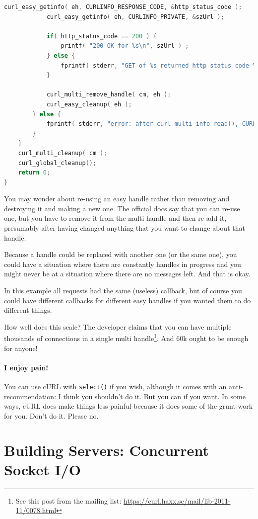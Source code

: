 \documentclass[a4paper]{report}
\begin{document}
\begin{lstlisting}[language=C]
            curl_easy_getinfo( eh, CURLINFO_RESPONSE_CODE, &http_status_code );
            curl_easy_getinfo( eh, CURLINFO_PRIVATE, &szUrl );

            if( http_status_code == 200 ) {
                printf( "200 OK for %s\n", szUrl ) ;
            } else {
                fprintf( stderr, "GET of %s returned http status code %d\n", szUrl, http_status_code );
            }

            curl_multi_remove_handle( cm, eh );
            curl_easy_cleanup( eh );
        } else {
            fprintf( stderr, "error: after curl_multi_info_read(), CURLMsg=%d\n", msg->msg );
        }
    }
    curl_multi_cleanup( cm );
    curl_global_cleanup();
    return 0;
}
\end{lstlisting}

You may wonder about re-using an easy handle rather than removing and destroying it and making a new one. The official docs say that you can re-use one, but you have to remove it from the multi handle and then re-add it, presumably after having changed anything that you want to change about that handle. 

Because a handle could be replaced with another one (or the same one), you could have a situation where there are constantly handles in progress and you might never be at a situation where there are no messages left. And that is okay.

In this example all requests had the same (useless) callback, but of course you could have different callbacks for different easy handles if you wanted them to do different things.

How well does this scale? The developer claims that you can have multiple thousands of connections in a single multi handle\footnote{See this post from the mailing list: \url{https://curl.haxx.se/mail/lib-2011-11/0078.html}}. And 60k ought to be enough for anyone!

\paragraph{I enjoy pain!} You can use cURL with \texttt{select()} if you wish, although it comes with an anti-recommendation: I think you shouldn't do it. But you can if you want. In some ways, cURL does make things less painful because it does some of the grunt work for you. Don't do it. Please no.

\section*{Building Servers: Concurrent Socket I/O}
\end{document}
